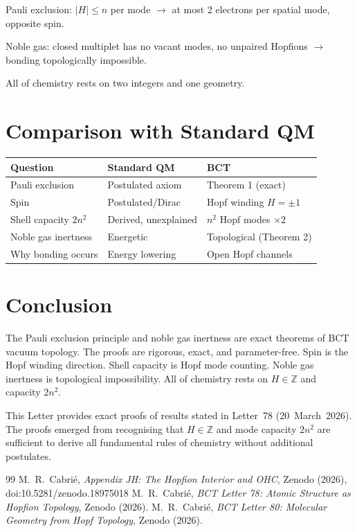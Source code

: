 \documentclass[aps,prl,twocolumn,showpacs,superscriptaddress]{revtex4-2}
\begin{document}
Pauli exclusion: $|H|\leq n$ per mode $\to$ at most 2 electrons 
per spatial mode, opposite spin.

Noble gas: closed multiplet has no vacant modes, no unpaired 
Hopfions $\to$ bonding topologically impossible.

All of chemistry rests on two integers and one geometry.

\section{Comparison with Standard QM}

\begin{center}
\begin{tabular}{lll}
\toprule
Question & Standard QM & BCT \\
\midrule
Pauli exclusion & Postulated axiom & Theorem 1 (exact) \\
Spin & Postulated/Dirac & Hopf winding $H=\pm1$ \\
Shell capacity $2n^2$ & Derived, unexplained & $n^2$ Hopf modes $\times2$ \\
Noble gas inertness & Energetic & Topological (Theorem 2) \\
Why bonding occurs & Energy lowering & Open Hopf channels \\
\bottomrule
\end{tabular}
\end{center}

\section{Conclusion}

The Pauli exclusion principle and noble gas inertness are exact 
theorems of BCT vacuum topology. The proofs are rigorous, exact, 
and parameter-free. Spin is the Hopf winding direction. Shell 
capacity is Hopf mode counting. Noble gas inertness is topological 
impossibility. All of chemistry rests on $H\in\mathbb{Z}$ and 
capacity $2n^2$.

\begin{acknowledgments}
This Letter provides exact proofs of results stated in Letter~78 
(20~March~2026). The proofs emerged from recognising that 
$H\in\mathbb{Z}$ and mode capacity $2n^2$ are sufficient to derive 
all fundamental rules of chemistry without additional postulates.
\end{acknowledgments}

\begin{thebibliography}{99}
 M.~R.~Cabri\'e, \textit{Appendix JH: The Hopfion 
Interior and OHC}, Zenodo (2026), doi:10.5281/zenodo.18975018
 M.~R.~Cabri\'e, \textit{BCT Letter 78: Atomic Structure 
as Hopfion Topology}, Zenodo (2026).
 M.~R.~Cabri\'e, \textit{BCT Letter 80: Molecular Geometry 
from Hopf Topology}, Zenodo (2026).
\end{thebibliography}
\end{document}
